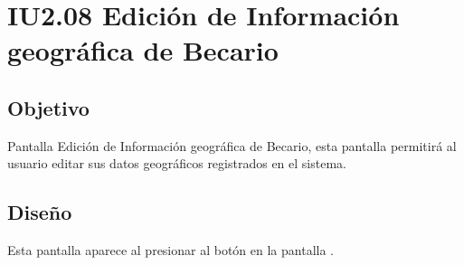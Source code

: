 \newpage
\section{IU2.08 Edición de Información geográfica de Becario}

\subsection{Objetivo}
	Pantalla Edición de Información geográfica de Becario, esta pantalla permitirá al usuario editar sus datos geográficos registrados en el sistema.
	


\subsection{Diseño}
	Esta pantalla aparece al presionar al botón  en la pantalla  .

	
